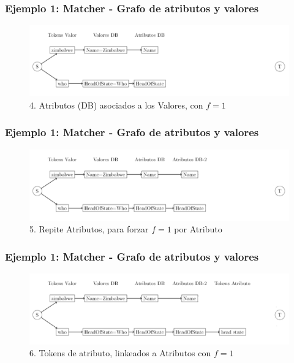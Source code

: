\begin{frame}
\frametitle{Ejemplo 1: Matcher - Grafo de atributos y valores}
\begin{figure}
  \centering
    \includegraphics[scale=.33]{graficos/presentacion/ejemplo-grafo-matcher-1-5}
    \caption{4. Atributos (DB) asociados a los Valores, con $f=1$}
\end{figure}
\end{frame}

\begin{frame}
\frametitle{Ejemplo 1: Matcher - Grafo de atributos y valores}
\begin{figure}
  \centering
    \includegraphics[scale=.33]{graficos/presentacion/ejemplo-grafo-matcher-1-5-2}
    \caption{5. Repite Atributos, para forzar $f=1$ por Atributo}
\end{figure}
\end{frame}

\begin{frame}
\frametitle{Ejemplo 1: Matcher - Grafo de atributos y valores}
\begin{figure}
  \centering
    \includegraphics[scale=.33]{graficos/presentacion/ejemplo-grafo-matcher-1-5-3}
    \caption{6. Tokens de atributo, linkeados a Atributos con $f=1$}
\end{figure}
\end{frame}

